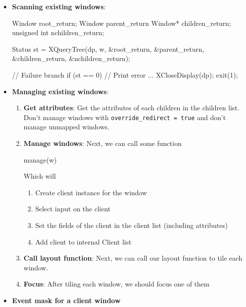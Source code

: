 \documentclass{report}
\begin{document}
\begin{itemize}
        \item \textbf{Scanning existing windows}: 
            \bigbreak \noindent 
            \begin{cppcode}
            Window root_return;
            Window parent_return
            Window* children_return;
            unsigned int nchildren_return;

            Status st = XQueryTree(dp, w, &root_return, &parent_return, &children_return, &nchildren_return);

            // Failure branch
            if (st == 0) {
                // Print error
                ...
                XCloseDisplay(dp);
                exit(1);
            }
            \end{cppcode}
        \item \textbf{Managing existing windows}:
            \begin{enumerate}
                \item \textbf{Get attributes}: Get the attributes of each children in the children list. Don't manage windows with \texttt{override\_redirect = true} and don't manage unmapped windows.
                \item \textbf{Manage windows}: Next, we can call some function
                    \bigbreak \noindent 
                    \begin{cppcode}
                    manage(w)
                    \end{cppcode}
                    \bigbreak \noindent 
                    Which will 
                    \begin{enumerate}
                        \item Create client instance for the window
                        \item Select input on the client
                        \item Set the fields of the client in the client list (including attributes) 
                        \item Add client to internal Client list
                    \end{enumerate}
                \item \textbf{Call layout function}: Next, we can call our layout function to tile each window.
                \item \textbf{Focus}: After tiling each window, we should focus one of them
            \end{enumerate}
        \item \textbf{Event mask for a client window}

\end{itemize}
\end{document}

